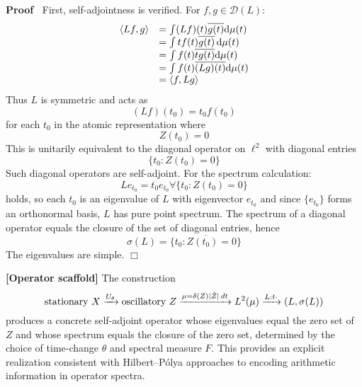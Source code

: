 \documentclass{article}
\newcommand{\mathd}{\mathrm{d}}
\newcommand{\tmstrong}[1]{\textbf{#1}}
\newenvironment{proof}{\noindent\textbf{Proof\ }}{\hspace*{\fill}$\Box$\medskip}
\begin{document}
\begin{proof}
  First, self-adjointness is verified. For $f, g \in \mathcal{D} (L)$:
  \begin{equation}
    \begin{array}{ll}
      \langle Lf, g \rangle & = \int (Lf) (t) \overline{g (t)} \mathd \mu
      (t)\\
      & = \int tf (t) \overline{g (t)} \hspace{0.17em} \mathd \mu (t)\\
      & = \int f (t) \overline{tg (t)} \mathd \mu (t)\\
      & = \int f (t) \overline{(Lg) (t)} \mathd \mu (t)\\
      & = \langle f, Lg \rangle
    \end{array}
  \end{equation}
  Thus $L$ is symmetric and acts as
  \begin{equation}
    (Lf) (t_0) = t_0 f (t_0)
  \end{equation}
  for each $t_0$ in the atomic representation where
  \begin{equation}
    Z (t_0) = 0
  \end{equation}
  This is unitarily equivalent to the diagonal operator on $\ell^2$ with
  diagonal entries
  \begin{equation}
    \{t_0 : Z (t_0) = 0\}
  \end{equation}
  Such diagonal operators are self-adjoint. For the spectrum calculation:
  \begin{equation}
    Le_{t_0} = t_0 e_{t_0} \forall \{t_0 : Z (t_0) = 0\}
  \end{equation}
  holds, so each $t_0$ is an eigenvalue of $L$ with eigenvector $e_{t_0}$ and
  since $\{e_{t_0} \}$ forms an orthonormal basis, $L$ has pure point
  spectrum. The spectrum of a diagonal operator equals the closure of the set
  of diagonal entries, hence
  \begin{equation}
    \sigma (L) = \overline{\{t_0 : Z (t_0) = 0\}}
  \end{equation}
  The eigenvalues are simple.
\end{proof}

\begin{remark}
  {\tmstrong{[Operator scaffold]\label{labelrem:scaffold}}} The construction
  \begin{equation}
    \text{stationary } X \xrightarrow{U_{\theta}} \text{oscillatory } Z
    \xrightarrow{\mu = \delta (Z) | \dot{Z} |  \hspace{0.17em} dt} L^2 (\mu)
    \xrightarrow{L : t \cdot} (L, \sigma (L))
  \end{equation}
  produces a concrete self-adjoint operator whose eigenvalues equal the zero
  set of $Z$ and whose spectrum equals the closure of the zero set, determined
  by the choice of time-change $\theta$ and spectral measure $F$. This
  provides an explicit realization consistent with Hilbert--P{\'o}lya
  approaches to encoding arithmetic information in operator spectra.
\end{remark}
\end{document}
